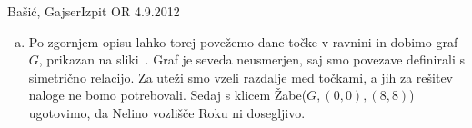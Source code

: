 \begin{naloga}{Bašić, Gajser}{Izpit OR 4.9.2012}
\begin{odgovor}
\begin{enumerate}[(a)]
\item Po zgornjem opisu lahko torej povežemo dane točke v ravnini in dobimo graf $G$, prikazan na sliki~\fig. 
Graf je seveda neusmerjen, saj smo povezave definirali s simetrično relacijo.
Za uteži smo vzeli razdalje med točkami, a jih za rešitev naloge ne bomo potrebovali.
Sedaj s klicem {\sc Žabe}($G, (0,0), (8,8)$) ugotovimo,
da Nelino vozlišče Roku ni dosegljivo.
\begin{slika}
\pgfslika
{}
\end{slika}

\end{enumerate}
\end{odgovor}
\end{naloga}
